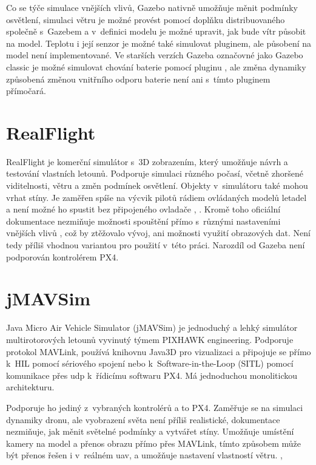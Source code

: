         Co se týče simulace vnějších vlivů, Gazebo nativně umožňuje měnit podmínky osvětlení, simulaci větru je možné provést pomocí doplňku distribuovaného společně s~Gazebem a v~definici modelu je možné upravit, jak bude vítr působit na model. Teplotu i její senzor je možné také simulovat pluginem, ale působení na model není implementované. Ve starších verzích Gazeba označovné jako Gazebo classic je možné simulovat chování baterie pomocí pluginu \cite{batplugin}, ale změna dynamiky způsobená změnou vnitřního odporu baterie není ani s~tímto pluginem přímočará.

    \section{RealFlight} \label{sec:realflight}
        RealFlight je komerční simulátor s~3D zobrazením, který umožňuje návrh a testování vlastních letounů. Podporuje simulaci různého počasí, včetně zhoršené viditelnosti, větru a změn podmínek osvětlení. Objekty v~simulátoru také mohou vrhat stíny. Je zaměřen spíše na výcvik pilotů rádiem ovládaných modelů letadel a není možné ho spustit bez připojeného ovladače \cite{ardupilot:realflight}, \cite{realflight}. Kromě toho oficiální dokumentace nezmiňuje možnosti spouštění přímo s~různými nastaveními vnějších vlivů \cite{realflight}, což by ztěžovalo vývoj, ani možnosti využití obrazových dat. Není tedy příliš vhodnou variantou pro použití v~této práci. Narozdíl od Gazeba není podporován kontrolérem PX4.

    \section{jMAVSim} \label{sec:jmavsim}
        Java Micro Air Vehicle Simulator (jMAVSim) je jednoduchý a lehký simulátor multirotorových letounů vyvinutý týmem PIXHAWK engineering. Podporuje protokol MAVLink, používá knihovnu Java3D pro vizualizaci a připojuje se přímo k~HIL pomocí sériového spojení nebo k~Software-in-the-Loop (SITL) pomocí komunikace přes \acrfull{udp} k~řídicímu softwaru PX4. Má jednoduchou monolitickou architekturu. \cite{Ebeid2018}

        Podporuje ho jediný z~vybraných kontrolérů a to PX4. Zaměřuje se na simulaci dynamiky dronu, ale vyobrazení světa není příliš realistické, dokumentace nezmiňuje, jak měnit světelné podmínky a vytvářet stíny. Umožňuje umístění kamery na model a přenos obrazu přímo přes MAVLink, tímto způsobem může být přenos řešen i v~reálném \acrshort{uav}, a umožňuje nastavení vlastností větru. \cite{jmavsim}, \cite{px4:jmavsim}

